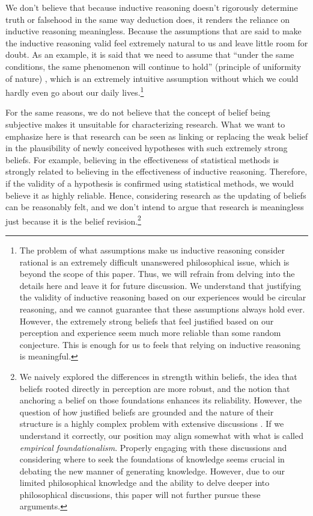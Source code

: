 \documentclass{book}
\begin{document}
We don't believe that because inductive reasoning doesn't rigorously determine truth or falsehood in the same way deduction does, it renders the reliance on inductive reasoning meaningless. Because the assumptions that are said to make the inductive reasoning valid feel extremely natural to us and leave little room for doubt. As an example, it is said that we need to assume that ``under the same conditions, the same phenomenon will continue to hold'' (principle of uniformity of nature) \cite{sep-induction-problem}, which is an extremely intuitive assumption without which we could hardly even go about our daily lives.\footnote{The problem of what assumptions make us inductive reasoning consider rational is an extremely difficult unanswered philosophical issue, which is beyond the scope of this paper. Thus, we will refrain from delving into the details here and leave it for future discussion. We understand that justifying the validity of inductive reasoning based on our experiences would be circular reasoning, and we cannot guarantee that these assumptions always hold ever. However, the extremely strong beliefs that feel justified based on our perception and experience seem much more reliable than some random conjecture. This is enough for us to feels that relying on inductive reasoning is meaningful.} 

For the same reasons, we do not believe that the concept of belief being subjective makes it unsuitable for characterizing research. What we want to emphasize here is that research can be seen as linking or replacing the weak belief in the plausibility of newly conceived hypotheses with such extremely strong beliefs. For example, believing in the effectiveness of statistical methods is strongly related to believing in the effectiveness of inductive reasoning. Therefore, if the validity of a hypothesis is confirmed using statistical methods, we would believe it as highly reliable. Hence, considering research as the updating of beliefs can be reasonably felt, and we don't intend to argue that research is meaningless just because it is the belief revision.\footnote{We naively explored the differences in strength within beliefs, the idea that beliefs rooted directly in perception are more robust, and the notion that anchoring a belief on those foundations enhances its reliability. However, the question of how justified beliefs are grounded and the nature of their structure is a highly complex problem with extensive discussions  \cite{sep-epistemology}. If we understand it correctly, our position may align somewhat with what is called \textit{empirical foundationalism}. Properly engaging with these discussions and considering where to seek the foundations of knowledge seems crucial in debating the new manner of generating knowledge. However, due to our limited philosophical knowledge and the ability to delve deeper into philosophical discussions, this paper will not further pursue these arguments.}
\end{document}
